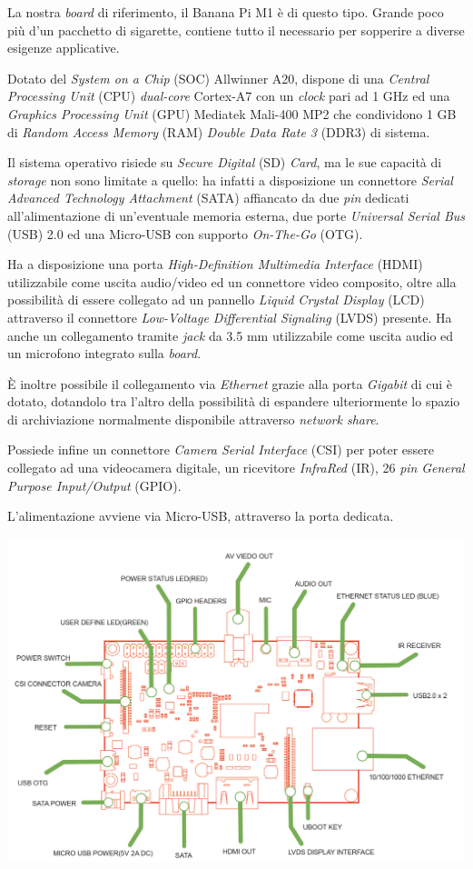 La nostra \emph{board} di riferimento, il Banana Pi M1 è di questo tipo. Grande 
poco più d'un pacchetto di sigarette, contiene tutto il necessario per 
sopperire a diverse esigenze applicative.

Dotato del \emph{System on a Chip} (SOC) Allwinner A20, dispone di una 
\textit{Central Processing Unit} (CPU) \emph{dual-core} Cortex-A7 con un 
\textit{clock} pari ad 1 GHz ed una \textit{Graphics Processing Unit} (GPU) 
Mediatek Mali-400 MP2 che condividono 1 GB di \textit{Random Access Memory} 
(RAM) \textit{Double Data Rate 3} (DDR3) di sistema.

Il sistema operativo risiede su \textit{Secure Digital} (SD) \textit{Card}, ma 
le sue capacità di \emph{storage} non sono limitate a quello: ha infatti a 
disposizione un connettore \textit{Serial Advanced Technology Attachment} 
(SATA) affiancato da due \emph{pin} dedicati all'alimentazione di un'eventuale 
memoria esterna, due porte \textit{Universal Serial Bus} (USB) 2.0 ed una 
Micro-USB con supporto \textit{On-The-Go} (OTG).

Ha a disposizione una porta \textit{High-Definition Multimedia Interface} 
(HDMI) utilizzabile come uscita audio/video ed un connettore video composito, 
oltre alla possibilità di essere collegato ad un pannello \textit{Liquid 
Crystal Display} (LCD) attraverso il connettore \textit{Low-Voltage 
Differential Signaling} (LVDS) presente. Ha anche un collegamento tramite 
\emph{jack} da 3.5 mm utilizzabile come uscita audio ed un microfono integrato 
sulla \emph{board}.

\`E inoltre possibile il collegamento via \textit{Ethernet} grazie alla porta 
\textit{Gigabit} di cui è dotato, dotandolo tra l'altro della possibilità di 
espandere ulteriormente lo spazio di archiviazione normalmente disponibile 
attraverso \emph{network share}.

Possiede infine un connettore \textit{Camera Serial Interface} (CSI) per poter 
essere collegato ad una videocamera digitale, un ricevitore \textit{InfraRed} 
(IR), 26 \textit{pin} \textit{General Purpose Input/Output} (GPIO).

L'alimentazione avviene via Micro-USB, attraverso la porta dedicata.

\includegraphics[width=1\textwidth]{Figures/bananapi_schema.png}